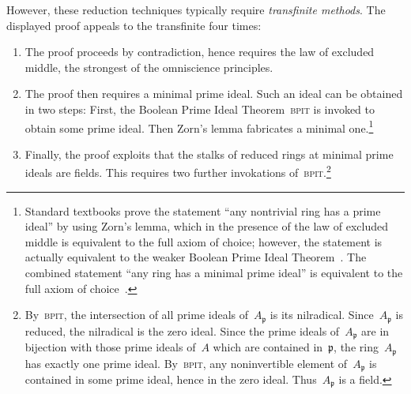 \documentclass{ws-rv9x6}
\newcommand{\ZZ}{\mathbb{Z}}
\newcommand{\ppp}{\mathfrak{p}}
\renewcommand{\_}{\mathpunct{.}}
\newcommand{\?}{\,{:}\,}
\newcommand{\BPIT}{\textsc{bpit}\xspace}
\begin{document}
However, these reduction techniques typically require \emph{transfinite
methods}. The displayed proof appeals to the transfinite four times:
\begin{enumerate}
\item The proof proceeds by contradiction, hence requires the law of excluded
middle, the strongest of the omniscience principles.
\item The proof then requires a minimal prime ideal. Such an ideal can be
obtained in two steps: First, the Boolean Prime Ideal
Theorem~\BPIT is invoked to obtain some prime ideal. Then
Zorn's lemma fabricates a minimal one.\footnote{Standard textbooks prove the statement ``any nontrivial
ring has a prime ideal'' by using Zorn's lemma, which
in the presence of the law of excluded middle is equivalent to the full axiom
of choice; however, the statement is actually equivalent to the weaker Boolean
Prime Ideal Theorem~\cite{scott:bpit,banaschewski-harting:lattice-aspects}.
The combined statement ``any ring has a minimal prime ideal'' is equivalent to
the full axiom of choice~\cite{savin:minimal-prime-ideals}.}
\item Finally, the proof exploits that the stalks of reduced rings at minimal
prime ideals are fields. This requires two further invokations
of~\BPIT.\footnote{By~\BPIT, the intersection of all prime ideals of~$A_\ppp$
is its nilradical. Since~$A_\ppp$ is reduced, the nilradical is the zero ideal.
Since the prime ideals of~$A_\ppp$ are in bijection with those prime ideals
of~$A$ which are contained in~$\ppp$, the ring~$A_\ppp$ has exactly one prime
ideal. By~\BPIT, any noninvertible element of~$A_\ppp$ is contained in some
prime ideal, hence in the zero ideal. Thus~$A_\ppp$ is a field.}
\end{enumerate}
\end{document}
